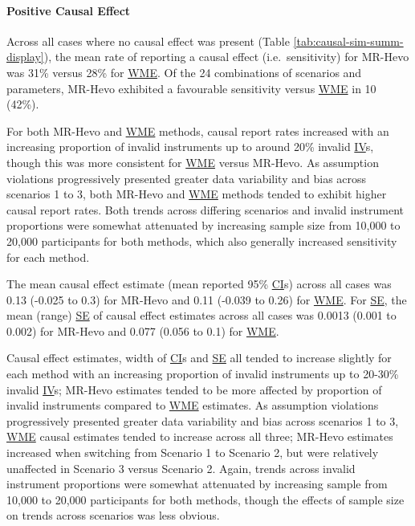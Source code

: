 \documentclass[
]{article}
\begin{document}
\paragraph{Positive Causal Effect}\label{results-sim-causal}

\leavevmode\newline Across all cases where no causal effect was present (Table \ref{tab:causal-sim-summ-display}), the mean rate of reporting a causal effect (i.e.~sensitivity) for MR-Hevo was 31\% versus 28\% for \hyperref[acronyms_WME]{WME}. Of the 24 combinations of scenarios and parameters, MR-Hevo exhibited a favourable sensitivity versus \hyperref[acronyms_WME]{WME} in 10 (42\%).

For both MR-Hevo and \hyperref[acronyms_WME]{WME} methods, causal report rates increased with an increasing proportion of invalid instruments up to around 20\% invalid \hyperref[acronyms_IV]{IV}s, though this was more consistent for \hyperref[acronyms_WME]{WME} versus MR-Hevo. As assumption violations progressively presented greater data variability and bias across scenarios 1 to 3, both MR-Hevo and \hyperref[acronyms_WME]{WME} methods tended to exhibit higher causal report rates. Both trends across differing scenarios and invalid instrument proportions were somewhat attenuated by increasing sample size from 10,000 to 20,000 participants for both methods, which also generally increased sensitivity for each method.

The mean causal effect estimate (mean reported 95\% \hyperref[acronyms_CI]{CI}s) across all cases was 0.13 (-0.025 to 0.3) for MR-Hevo and 0.11 (-0.039 to 0.26) for \hyperref[acronyms_WME]{WME}. For \hyperref[acronyms_SE]{SE}, the mean (range) \hyperref[acronyms_SE]{SE} of causal effect estimates across all cases was 0.0013 (0.001 to 0.002) for MR-Hevo and 0.077 (0.056 to 0.1) for \hyperref[acronyms_WME]{WME}.

Causal effect estimates, width of \hyperref[acronyms_CI]{CI}s and \hyperref[acronyms_SE]{SE} all tended to increase slightly for each method with an increasing proportion of invalid instruments up to 20-30\% invalid \hyperref[acronyms_IV]{IV}s; MR-Hevo estimates tended to be more affected by proportion of invalid instruments compared to \hyperref[acronyms_WME]{WME} estimates. As assumption violations progressively presented greater data variability and bias across scenarios 1 to 3, \hyperref[acronyms_WME]{WME} causal estimates tended to increase across all three; MR-Hevo estimates increased when switching from Scenario 1 to Scenario 2, but were relatively unaffected in Scenario 3 versus Scenario 2. Again, trends across invalid instrument proportions were somewhat attenuated by increasing sample from 10,000 to 20,000 participants for both methods, though the effects of sample size on trends across scenarios was less obvious.
\end{document}
